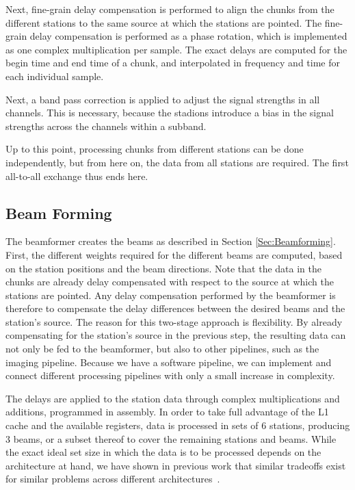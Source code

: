 \documentclass{llncs}
\begin{document}
Next, fine-grain delay compensation is performed to align the chunks from the different stations to the same source at which the stations are pointed. The fine-grain delay compensation is performed as a phase rotation, which is implemented as one complex multiplication per sample. The exact delays are computed for the begin time and end time of a chunk, and interpolated in frequency and time for each individual sample. %

Next, a band pass correction is applied to adjust the signal strengths in all channels. This is necessary, because the stadions introduce a bias in the signal strengths across the channels within a subband.

Up to this point, processing chunks from different stations can be done independently, but from here on, the data from all stations are required. The first all-to-all exchange thus ends here.

\subsection{Beam Forming}

The beamformer creates the beams as described in Section \ref{Sec:Beamforming}. First, the different weights required for the different beams are computed, based on the station positions and the beam directions. Note that the data in the chunks are already delay compensated with respect to the source at which the stations are pointed. Any delay compensation performed by the beamformer is therefore to compensate the delay differences between the desired beams and the station's source. The reason for this two-stage approach is flexibility. By already compensating for the station's source in the previous step, the resulting data can not only be fed to the beamformer, but also to other pipelines, such as the imaging pipeline. Because we have a software pipeline, we can implement and connect different processing pipelines with only a small increase in complexity.

The delays are applied to the station data through complex multiplications and additions, programmed in assembly. In order to take full advantage of the L1 cache and the available registers, data is processed in sets of 6 stations, producing 3 beams, or a subset thereof to cover the remaining stations and beams. While the exact ideal set size in which the data is to be processed depends on the architecture at hand, we have shown in previous work that similar tradeoffs exist for similar problems across different architectures~\cite{Nieuwpoort:09,BAR}.
\end{document}
